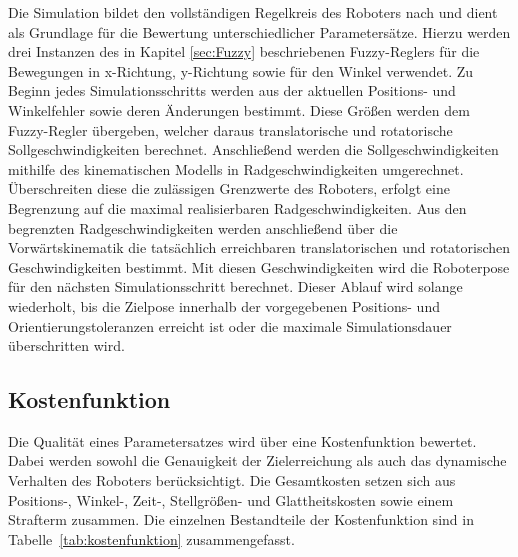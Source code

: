 Die Simulation bildet den vollständigen Regelkreis des Roboters nach und dient als Grundlage für die Bewertung unterschiedlicher Parametersätze. Hierzu werden drei Instanzen des in Kapitel \ref{sec:Fuzzy} beschriebenen Fuzzy-Reglers für die Bewegungen in x-Richtung, y-Richtung sowie für den Winkel verwendet. Zu Beginn jedes Simulationsschritts werden aus der aktuellen Positions- und Winkelfehler sowie deren Änderungen bestimmt. Diese Größen werden dem Fuzzy-Regler übergeben, welcher daraus translatorische und rotatorische Sollgeschwindigkeiten berechnet. Anschließend werden die Sollgeschwindigkeiten mithilfe des kinematischen Modells in Radgeschwindigkeiten umgerechnet. Überschreiten diese die zulässigen Grenzwerte des Roboters, erfolgt eine Begrenzung auf die maximal realisierbaren Radgeschwindigkeiten. Aus den begrenzten Radgeschwindigkeiten werden anschließend über die Vorwärtskinematik die tatsächlich erreichbaren translatorischen und rotatorischen Geschwindigkeiten bestimmt. Mit diesen Geschwindigkeiten wird die Roboterpose für den nächsten Simulationsschritt berechnet. Dieser Ablauf wird solange wiederholt, bis die Zielpose innerhalb der vorgegebenen Positions- und Orientierungstoleranzen erreicht ist oder die maximale Simulationsdauer überschritten wird.

\subsection{Kostenfunktion}

Die Qualität eines Parametersatzes wird über eine Kostenfunktion bewertet. Dabei werden sowohl die Genauigkeit der Zielerreichung als auch das dynamische Verhalten des Roboters berücksichtigt. Die Gesamtkosten setzen sich aus Positions-, Winkel-, Zeit-, Stellgrößen- und Glattheitskosten sowie einem Strafterm zusammen. Die einzelnen Bestandteile der Kostenfunktion sind in Tabelle~\ref{tab:kostenfunktion} zusammengefasst.

